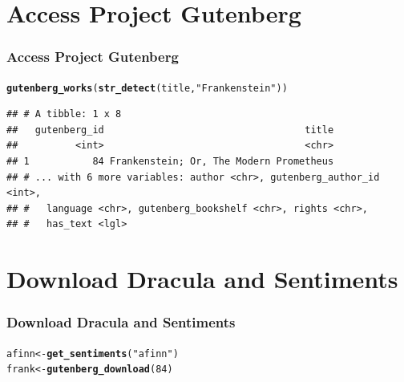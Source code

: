 \documentclass{beamer}\usepackage[]{graphicx}\usepackage[]{color}
\makeatletter
\newcommand{\hlnum}[1]{\textcolor[rgb]{0.686,0.059,0.569}{#1}}%
\newcommand{\hlstr}[1]{\textcolor[rgb]{0.192,0.494,0.8}{#1}}%
\newcommand{\hlstd}[1]{\textcolor[rgb]{0.345,0.345,0.345}{#1}}%
\newcommand{\hlkwb}[1]{\textcolor[rgb]{0.69,0.353,0.396}{#1}}%
\newcommand{\hlkwd}[1]{\textcolor[rgb]{0.737,0.353,0.396}{\textbf{#1}}}%
\newenvironment{kframe}{%
 \def\at@end@of@kframe{}%
 \ifinner\ifhmode%
  \def\at@end@of@kframe{\end{minipage}}%
  \begin{minipage}{\columnwidth}%
 \fi\fi%
 \def\FrameCommand##1{\hskip\@totalleftmargin \hskip-\fboxsep
 \colorbox{shadecolor}{##1}\hskip-\fboxsep
     \hskip-\linewidth \hskip-\@totalleftmargin \hskip\columnwidth}%
 \MakeFramed {\advance\hsize-\width
   \@totalleftmargin\z@ \linewidth\hsize
   \@setminipage}}%
 {\par\unskip\endMakeFramed%
 \at@end@of@kframe}
\newenvironment{knitrout}{}{} %
\makeatother
\begin{document}
\section{Access Project Gutenberg}
\begin{frame}[fragile]
  \frametitle{Access Project Gutenberg}
\begin{knitrout}
\color{fgcolor}\begin{kframe}
\begin{alltt}
\hlkwd{gutenberg_works}\hlstd{(}\hlkwd{str_detect}\hlstd{(title,} \hlstr{"Frankenstein"}\hlstd{))}
\end{alltt}
\begin{verbatim}
## # A tibble: 1 x 8
##   gutenberg_id                                   title
##          <int>                                   <chr>
## 1           84 Frankenstein; Or, The Modern Prometheus
## # ... with 6 more variables: author <chr>, gutenberg_author_id <int>,
## #   language <chr>, gutenberg_bookshelf <chr>, rights <chr>,
## #   has_text <lgl>
\end{verbatim}
\end{kframe}
\end{knitrout}
\end{frame}

\section{Download Dracula and Sentiments}
\begin{frame}[fragile]
  \frametitle{Download Dracula and Sentiments}
\begin{knitrout}
\color{fgcolor}\begin{kframe}
\begin{alltt}
\hlstd{afinn} \hlkwb{<-} \hlkwd{get_sentiments}\hlstd{(}\hlstr{"afinn"}\hlstd{)}
\hlstd{frank} \hlkwb{<-} \hlkwd{gutenberg_download}\hlstd{(}\hlnum{84}\hlstd{)}
\end{alltt}
\end{kframe}
\end{knitrout}
\end{frame}
\end{document}
